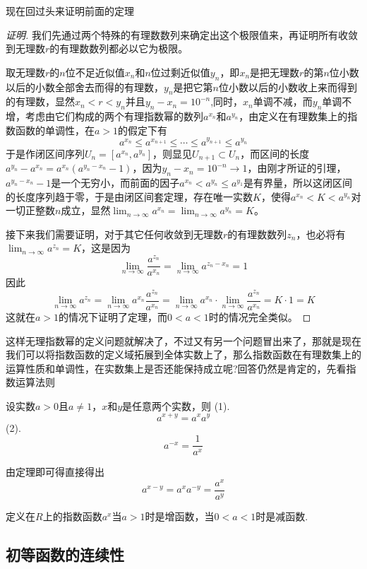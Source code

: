 现在回过头来证明前面的定理
\begin{proof}[证明]
  我们先通过两个特殊的有理数数列来确定出这个极限值来，再证明所有收敛到无理数$r$的有理数数列都必以它为极限。

  取无理数$r$的$n$位不足近似值$x_n$和$n$位过剩近似值$y_n$，即$x_n$是把无理数$r$的第$n$位小数以后的小数全部舍去而得的有理数，$y_n$是把它第$n$位小数以后的小数收上来而得到的有理数，显然$x_n<r<y_n$并且$y_n-x_n=10^{-n}$,同时，$x_n$单调不减，而$y_n$单调不增，考虑由它们构成的两个有理指数幂的数列$a^{x_n}$和$a^{y_n}$，由定义在有理数集上的指数函数的单调性，在$a>1$的假定下有
  \[ a^{x_n} \leqslant a^{x_{n+1}} \leqslant \cdots \leqslant a^{y_{n+1}} \leqslant a^{y_n} \]
  于是作闭区间序列$U_n = [a^{x_n},a^{y_n}]$，则显见$U_{n+1} \subset U_n$，而区间的长度$a^{y_n}-a^{x_n}=a^{x_n}(a^{y_n-x_n}-1)$，因为$y_n-x_n=10^{-n} \to 1$，由刚才所证的引理，$a^{y_n-x_n}-1$是一个无穷小，而前面的因子$a^{x_n}<a^{y_n} \leqslant a^{y_1}$是有界量，所以这闭区间的长度序列趋于零，于是由闭区间套定理，存在唯一实数$K$，使得$a^{x_n}<K<a^{y_n}$对一切正整数$n$成立，显然$\lim_{n \to \infty}a^{x_n} = \lim_{n \to \infty}a^{y_n}=K$。

  接下来我们需要证明，对于其它任何收敛到无理数$r$的有理数数列$z_n$，也必将有$\lim_{n \to \infty}a^{z_n}=K$，这是因为
  \[ \lim_{n \to \infty} \frac{a^{z_n}}{a^{x_n}} = \lim_{n \to \infty} a^{z_n-x_n} = 1 \]
  因此
  \[ \lim_{n \to \infty} a^{z_n} = \lim_{n \to \infty} a^{x_n} \frac{a^{z_n}}{a^{x_n}} = \lim_{n \to \infty} a^{x_n} \cdot \lim_{n \to \infty} \frac{a^{z_n}}{a^{x_n}} = K \cdot 1 = K \]
  这就在$a>1$的情况下证明了定理，而$0<a<1$时的情况完全类似。
\end{proof}

这样无理指数幂的定义问题就解决了，不过又有另一个问题冒出来了，那就是现在我们可以将指数函数的定义域拓展到全体实数上了，那么指数函数在有理数集上的运算性质和单调性，在实数集上是否还能保持成立呢?回答仍然是肯定的，先看指数运算法则
\begin{theorem}
  设实数$a>0$且$a \neq 1$，$x$和$y$是任意两个实数，则
  (1).
  \[ a^{x+y} = a^xa^y \]
  (2).
  \[ a^{-x} = \frac{1}{a^x} \]
\end{theorem}

由定理即可得直接得出
\[ a^{x-y} = a^x a^{-y} = \frac{a^x}{a^y} \]

\begin{theorem}
  定义在$R$上的指数函数$a^x$当$a>1$时是增函数，当$0<a<1$时是减函数.
\end{theorem}

\subsection{初等函数的连续性}
\label{sec:the-continuity-of-elementary-function}

